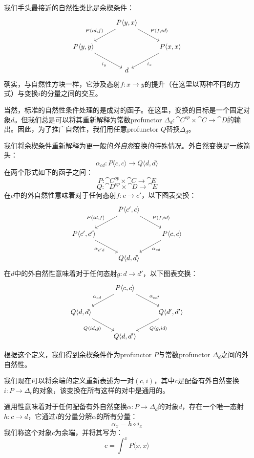 \documentclass[DaoFP]{subfiles}
\begin{document}
我们手头最接近的自然性类比是余楔条件：
\[
 \begin{tikzcd}
 &P \langle y, x \rangle
 \arrow[ld, "{P \langle id, f \rangle}"']
 \arrow[rd, "{P \langle f, id \rangle}"]
 \\
 P \langle y, y \rangle
 \arrow[dr, "i_y"']
 &&P \langle x, x \rangle
 \arrow[dl, "i_x"]
 \\
 &d
 \end{tikzcd}
\]
确实，与自然性方块一样，它涉及态射$f \colon x \to y$的提升（在这里以两种不同的方式）与变换$i$的分量之间的交互。

当然，标准的自然性条件处理的是成对的函子。在这里，变换的目标是一个固定对象$d$。但我们总是可以将其重新解释为常数profunctor $\Delta_d \colon \cat C^{op} \times \cat C \to \cat D$的输出。因此，为了推广自然性，我们用任意profunctor $Q$替换$\Delta_d$。

我们将余楔条件重新解释为更一般的\emph{外自然}变换的特殊情况。外自然变换是一族箭头：
\[ \alpha_{c d} \colon P \langle c, c \rangle \to Q \langle d, d \rangle \]
在两个形式如下的函子之间：
\[ P \colon \cat C^{op} \times \cat C \to \cat E \]
\[ Q \colon \cat D^{op} \times \cat D \to \cat E \]
在$c$中的外自然性意味着对于任何态射$f \colon c \to c'$，以下图表交换：
\[
 \begin{tikzcd}
 &P \langle c', c \rangle
 \arrow[ld, "{P \langle id, f \rangle}"']
 \arrow[rd, "{P \langle f, id \rangle}"]
 \\
      P \langle c', c' \rangle
 \arrow[dr, "\alpha_{c' d}"']
 &&P \langle c, c \rangle
 \arrow[dl, "\alpha_{c d}"]
 \\
 & Q \langle d, d \rangle
 \end{tikzcd}
\]
在$d$中的外自然性意味着对于任何态射$g \colon d \to d'$，以下图表交换：
\[
 \begin{tikzcd}
 &P \langle c, c \rangle
 \arrow[ld, "\alpha_{c d}"']
 \arrow[rd, "\alpha_{c d'}"]
 \\
      Q \langle d, d \rangle
 \arrow[dr, "{Q \langle id, g\rangle}"']
 &&Q \langle d', d' \rangle
 \arrow[dl, "{Q \langle g,  id\rangle}"]
 \\
 & Q \langle d, d' \rangle
 \end{tikzcd}
\]

根据这个定义，我们得到余楔条件作为profunctor $P$与常数profunctor $\Delta_d$之间的外自然性。

我们现在可以将余端的定义重新表述为一对$(c, i)$，其中$c$是配备有外自然变换$i \colon P \to \Delta_c$的对象，该变换在所有这样的对中是通用的。

通用性意味着对于任何配备有外自然变换$\alpha \colon P \to \Delta_d$的对象$d$，存在一个唯一态射$h \colon c \to d$，它通过$i$的分量分解$\alpha$的所有分量：
\[ \alpha_x = h \circ i_x \]
我们称这个对象$c$为余端，并将其写为：
\[ c = \int^x P\langle x, x \rangle \]
\end{document}
